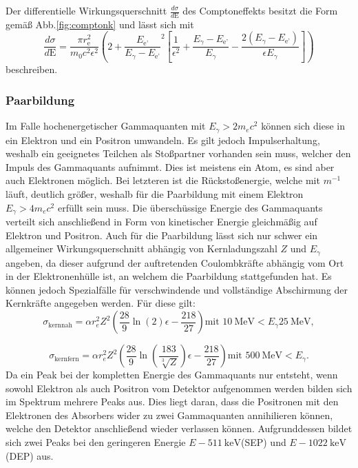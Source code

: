 Der differentielle Wirkungsquerschnitt $\frac{d \sigma}{d\text{E}}$ des Comptoneffekts besitzt die Form gemäß Abb.\ref{fig:comptonk} und lässt sich mit
\begin{equation}
    \frac{d \sigma}{d\text{E}} =  \frac{\pi r_\text{e}^2}{m_0 c^2 \epsilon^2}\left(2+\frac{E_\text{e'}}{E_\gamma - E_\text{e'}}^2 \left[ \frac{1}{\epsilon^2} +\frac{E_\gamma - E_\text{e'}}{E_\gamma} - \frac{2(E_\gamma - E_\text{e'})}{\epsilon E_\gamma} \right]\right) \label{eq:sigmacompdiff}
\end{equation}
beschreiben.

\subsubsection{Paarbildung}
Im Falle hochenergetischer Gammaquanten mit $E_\gamma > 2 m_e c^2$ können sich diese in ein Elektron und ein Positron umwandeln. Es gilt jedoch Impulserhaltung, weshalb ein geeignetes Teilchen als Stoßpartner vorhanden sein muss, welcher den Impuls des Gammaquants aufnimmt. Dies ist meistens ein Atom, es sind aber auch Elektronen möglich. Bei letzteren ist die Rückstoßenergie, welche mit $m^{-1}$ läuft, deutlich größer, weshalb für die Paarbildung mit einem Elektron $E_\gamma > 4 m_e c^2$ erfüllt sein muss. Die überschüssige Energie des Gammaquants verteilt sich anschließend in Form von kinetischer Energie gleichmäßig auf Elektron und Positron. Auch für die Paarbildung lässt sich nur schwer ein allgemeiner Wirkungsquerschnitt abhängig von Kernladungszahl $Z$ und $E_\gamma$ angeben, da dieser aufgrund der auftretenden Coulombkräfte abhängig vom Ort in der Elektronenhülle ist, an welchem die Paarbildung stattgefunden hat. Es können jedoch Spezialfälle für verschwindende und vollständige Abschirmung der Kernkräfte angegeben werden. Für diese gilt:
\begin{equation}
    \sigma_\text{kernnah} = \alpha r_e^2 Z^2 \left( \frac{28}{9}\ln(2) \epsilon - \frac{218}{27}\right) \text{mit } \SI{10}{\mega\electronvolt} < E_\gamma \SI{25}{\mega\electronvolt} \label{eq:sigmapaar1},
\end{equation}

\begin{equation}
    \sigma_\text{kernfern} = \alpha r_e^2 Z^2 \left( \frac{28}{9}\ln\left(\frac{183}{\sqrt[3]{Z}}\right) \epsilon - \frac{218}{27}\right) \text{mit } \SI{500}{\mega\electronvolt} < E_\gamma \label{eq:sigmapaar2}.
\end{equation}
Da ein Peak bei der kompletten Energie des Gammaquants nur entsteht, wenn sowohl Elektron als auch Positron vom Detektor aufgenommen werden bilden sich im Spektrum mehrere Peaks aus. Dies liegt daran, dass die Positronen mit den Elektronen des Absorbers wider zu zwei Gammaquanten annihilieren können, welche den Detektor anschließend wieder verlassen können. Aufgrunddessen bildet sich zwei Peaks bei den geringeren Energie $E-\SI{511}{\kilo\electronvolt}$(SEP) und $E-\SI{1022}{\kilo\electronvolt}$(DEP) aus.  

